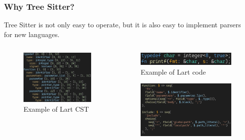\documentclass[dvipsnames, 10pt, table]{beamer}
\begin{document}
\begin{frame}
  \frametitle{Why Tree Sitter?}
  Tree Sitter is not only easy to operate, but it is also easy to implement parsers for new languages.

  \begin{columns}
    \begin{column}{0.5\textwidth}
      \begin{figure}
        \begin{center}
          \includegraphics[width=1.0\textwidth]{figures/solution/ts-lart-cst.png}
          \caption{Example of Lart CST}
        \end{center}
      \end{figure}
    \end{column}
    \begin{column}{0.5\textwidth}
      \begin{figure}
        \begin{center}
          \includegraphics[width=1.0\textwidth]{figures/solution/ts-lart-code.png}
          \caption{Example of Lart code}
        \end{center}
      \end{figure}
      \begin{figure}
        \begin{center}
          \includegraphics[width=1.0\textwidth]{figures/solution/ts-lart-grammar.png}

\end{center}
\end{figure}
\end{column}
\end{columns}
\end{frame}
\end{document}
